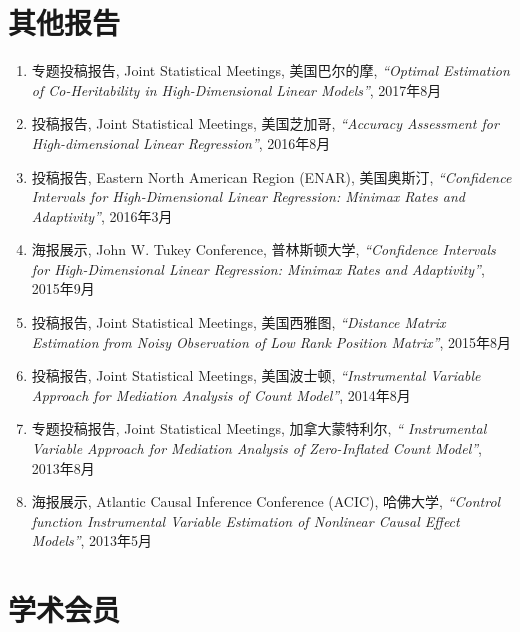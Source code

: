 \documentclass[margin, line]{res}
\begin{document}
\begin{resume}
		\section{\sc 其他报告}
        \begin{enumerate}
            \setlength{\itemsep}{3pt}

            \item 专题投稿报告, Joint Statistical Meetings, 美国巴尔的摩, {\it ``Optimal Estimation of Co-Heritability in High-Dimensional Linear Models''},
                2017年8月

            \item 投稿报告, Joint Statistical Meetings, 美国芝加哥, {\it ``Accuracy Assessment for High-dimensional Linear Regression''},
                2016年8月

            \item 投稿报告, Eastern North American Region (ENAR), 美国奥斯汀, {\it ``Confidence Intervals for High-Dimensional Linear Regression: Minimax Rates and Adaptivity''},
                2016年3月

            \item 海报展示, John W. Tukey Conference, 普林斯顿大学,
                {\it ``Confidence Intervals for High-Dimensional Linear Regression: Minimax Rates and Adaptivity''},
                2015年9月

            \item 投稿报告, Joint Statistical Meetings, 美国西雅图, {\it ``Distance Matrix Estimation from Noisy Observation of Low Rank Position Matrix''},
                2015年8月

            \item 投稿报告, Joint Statistical Meetings, 美国波士顿, {\it ``Instrumental Variable Approach for Mediation Analysis of Count Model''},
                2014年8月

            \item 专题投稿报告, Joint Statistical Meetings, 加拿大蒙特利尔,
                {\it `` Instrumental Variable Approach for Mediation Analysis of Zero-Inflated Count Model''},
                2013年8月

            \item 海报展示, Atlantic Causal Inference Conference (ACIC), 哈佛大学,
                {\it ``Control function Instrumental Variable Estimation of Nonlinear Causal Effect Models''},
                2013年5月
        \end{enumerate}

		\section{\sc 学术会员}


\end{resume}
\end{document}
